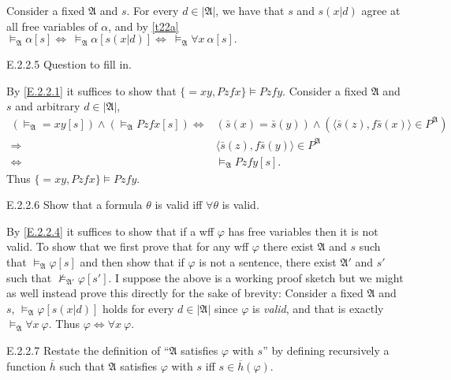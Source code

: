 Consider a fixed $\mathfrak{A}$ and $s$. For every $d\in|\mathfrak{A}|$, we have that $s$ and $s(x|d)$ agree at all free variables of $\alpha$, and by \ref{t22a} $\vDash_{\mathfrak{A}}\alpha[s]\Leftrightarrow\ \vDash_{\mathfrak{A}}\alpha[s(x|d)]\Leftrightarrow\ \vDash_{\mathfrak{A}}\forall x\ \alpha[s].$

\begin{exercise}{E.2.2.5}
  Question to fill in.
\end{exercise}

By \ref{E.2.2.1} it suffices to show that $\{=xy, Pzfx\}\vDash Pzfy$. Consider a fixed $\mathfrak{A}$ and $s$ and arbitrary $d\in|\mathfrak{A}|$,
\begin{align*}
  (\vDash_{\mathfrak{A}}=xy[s])\wedge(\vDash_{\mathfrak{A}}Pzfx[s])
  \Leftrightarrow & (\bar{s}(x)=\bar{s}(y))\wedge(\langle\bar{s}(z),f\bar{s}(x)\rangle\in P^{\mathfrak{A}}) \\
  \Rightarrow     & \langle\bar{s}(z),f\bar{s}(y)\rangle\in P^{\mathfrak{A}}                                \\
  \Leftrightarrow & \vDash_{\mathfrak{A}}Pzfy[s].
\end{align*}
Thus $\{=xy, Pzfx\}\vDash Pzfy$.

\begin{exercise}{E.2.2.6}
  Show that a formula $\theta$ is valid iff $\forall\theta$ is valid.
\end{exercise}

By \ref{E.2.2.4} it suffices to show that if a wff $\varphi$ has free variables then it is not valid. To show that we first prove that for any wff $\varphi$ there exist $\mathfrak{A}$ and $s$ such that $\vDash_{\mathfrak{A}}\varphi[s]$ and then show that if $\varphi$ is not a sentence, there exist $\mathfrak{A}'$ and $s'$ such that $\nvDash_{\mathfrak{A}'}\varphi[s']$. I suppose the above is a working proof sketch but we might as well instead prove this directly for the sake of brevity: Consider a fixed $\mathfrak{A}$ and $s$, $\vDash_{\mathfrak{A}}\varphi[s(x|d)]$ holds for every $d\in|\mathfrak{A}|$ since $\varphi$ is \textit{valid}, and that is exactly $\vDash_{\mathfrak{A}}\forall x\ \varphi$. Thus $\varphi \Leftrightarrow\forall x\ \varphi$.

\begin{exercise}{E.2.2.7}
  Restate the definition of ``$\mathfrak{A}$ satisfies $\varphi$ with $s$'' by defining recursively a function $\overline{h}$ such that $\mathfrak{A}$ satisfies $\varphi$ with $s$ iff $s\in \overline{h}(\varphi).$
\end{exercise}

